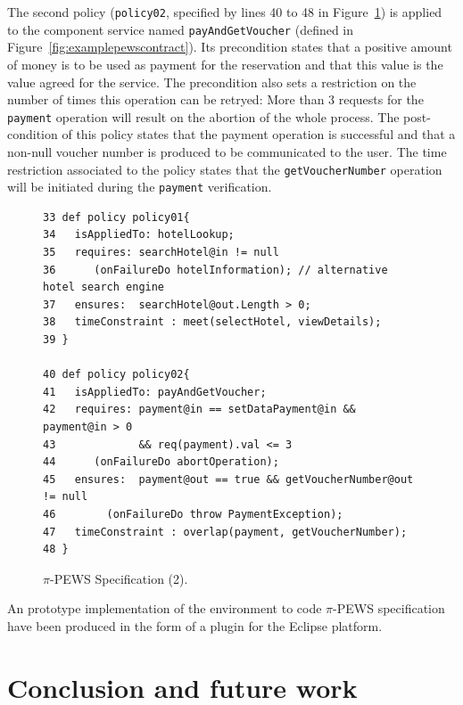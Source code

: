 \documentclass{sig-alternate}
\begin{document}
The second policy (\texttt{policy02}, specified by lines 40 to 48 in
Figure~\ref{fig:examplepewscontract2}) is applied to the component service named \texttt{payAndGetVoucher} (defined in Figure~\ref{fig:examplepewscontract}). Its precondition states that a positive amount of money is to be used as payment for the reservation and that this value is the value agreed for the service.
The precondition also sets a restriction on the number of times this operation can be retryed: More than 3 requests for the \texttt{payment} operation will result on the abortion of the whole process.
The post-condition of this policy states that the payment operation is successful and that a non-null voucher number is produced to be communicated to the user.
The time restriction associated to the policy states that the \texttt{getVoucherNumber} operation will be initiated during the \texttt{payment} verification.

\begin{figure}
\centering
\tiny
\begin{verbatim}
33 def policy policy01{
34   isAppliedTo: hotelLookup;
35   requires: searchHotel@in != null
36      (onFailureDo hotelInformation); // alternative hotel search engine
37   ensures:  searchHotel@out.Length > 0;
38   timeConstraint : meet(selectHotel, viewDetails);
39 }

40 def policy policy02{
41   isAppliedTo: payAndGetVoucher;
42   requires: payment@in == setDataPayment@in && payment@in > 0
43             && req(payment).val <= 3
44      (onFailureDo abortOperation);
45   ensures:  payment@out == true && getVoucherNumber@out != null
46        (onFailureDo throw PaymentException);
47   timeConstraint : overlap(payment, getVoucherNumber);
48 }
\end{verbatim}
\caption{$\pi$-PEWS Specification (2).}
\label{fig:examplepewscontract2}
\end{figure}

An prototype implementation of the environment to code $\pi$-PEWS specification 
have been produced in the form of a plugin for the Eclipse platform.

\section{Conclusion and future work}\label{sec:conclusion} 
\end{document}

